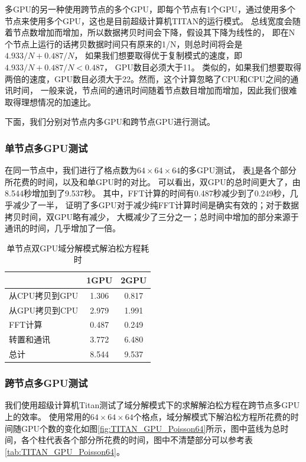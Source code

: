 多GPU的另一种使用跨节点的多个GPU，即每个节点有1个GPU，通过使用多个节点来使用多个GPU，这也是目前超级计算机TITAN的运行模式。
总线宽度会随着节点数增加而增加，所以数据拷贝时间会下降，假设其下降为线性的，
即在N个节点上运行的话拷贝数据时间只有原来的1/N，则总时间将会是 $4.933/N+0.487/N$，
如果我们想要取得优于复制模式的速度，即 $4.933/N+0.487/N<0.487$， GPU数目必须大于11。
类似的，如果我们想要取得两倍的速度，GPU数目必须大于22。然而，这个计算忽略了CPU和CPU之间的通讯时间，
一般来说，节点间的通讯时间随着节点数目增加而增加，因此我们很难取得理想情况的加速比。

下面，我们分别对节点内多GPU和跨节点GPU进行测试。

\subsubsection{单节点多GPU测试}
在同一节点中，我们进行了格点数为$64 \times 64 \times 64$的多GPU测试，
表\ref{tab:2GPU_Poisson}是各个部分所花费的时间，以及和单GPU时的对比。
可以看出，双GPU的总时间更大了，由8.544秒增加到了9.537秒。
其中，FFT计算的时间有0.487秒减少到了0.249秒，几乎减少了一半，
证明了多GPU对于减少纯FFT计算时间是确实有效的；对于数据拷贝时间，双GPU略有减少，
大概减少了三分之一；总时间中增加的部分来源于通讯的时间，几乎增加了一倍。
\begin{table}[!htbp]
    \centering
    \footnotesize%
    \setlength{\tabcolsep}{4pt}%
    \renewcommand{\arraystretch}{1.2}%
    \caption{单节点双GPU域分解模式解泊松方程耗时}
    \begin{tabular}{lcc}
        \hline\hline
                          & 1GPU    & 2GPU   \\
        \hline\hline
        从CPU拷贝到GPU    & 1.306   & 0.817  \\
        \hline
        从GPU拷贝到CPU    & 2.979   & 1.991  \\
        \hline
        FFT计算           & 0.487   & 0.249  \\
        \hline
        转置和通讯        & 3.772   & 6.480  \\
        \hline
        总计              & 8.544   & 9.537  \\
        \hline\hline
    \end{tabular}
    \label{tab:2GPU_Poisson}
\end{table}

\subsubsection{跨节点多GPU测试}
我们使用超级计算机Titan测试了域分解模式下的求解解泊松方程在跨节点多GPU上的效率。
使用常用的$64 \times 64 \times 64$个格点，域分解模式下解泊松方程所花费的时间随GPU个数的变化如图\ref{fig:TITAN_GPU_Poisson64}所示，图中蓝线为总时间，各个柱代表各个部分所花费的时间，图中不清楚部分可以参考表\ref{tab:TITAN_GPU_Poisson64}。

